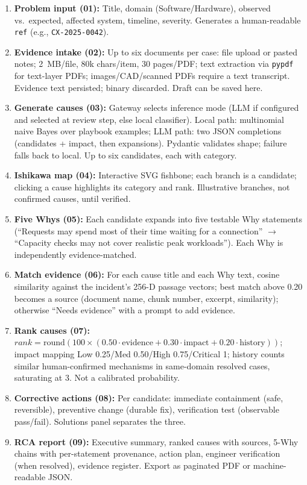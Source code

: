 \documentclass[12pt,a4paper,oneside]{report}
\begin{document}
\begin{enumerate}[label=\textbf{\arabic*.},leftmargin=1.6em]
\item \textbf{Problem input (01):} Title, domain (Software/Hardware), observed vs.\ expected, affected system, timeline, severity. Generates a human-readable \texttt{ref} (e.g., \texttt{CX-2025-0042}).
\item \textbf{Evidence intake (02):} Up to six documents per case: file upload or pasted notes; 2~MB/file, 80k chars/item, 30 pages/PDF; text extraction via \texttt{pypdf} for text-layer PDFs; images/CAD/scanned PDFs require a text transcript. Evidence text persisted; binary discarded. Draft can be saved here.
\item \textbf{Generate causes (03):} Gateway selects inference mode (LLM if configured and selected at review step, else local classifier). Local path: multinomial naive Bayes over playbook examples; LLM path: two JSON completions (candidates + impact, then expansions). Pydantic validates shape; failure falls back to local. Up to six candidates, each with category.
\item \textbf{Ishikawa map (04):} Interactive SVG fishbone; each branch is a candidate; clicking a cause highlights its category and rank. Illustrative branches, not confirmed causes, until verified.
\item \textbf{Five Whys (05):} Each candidate expands into five testable Why statements (``Requests may spend most of their time waiting for a connection'' $\rightarrow$ ``Capacity checks may not cover realistic peak workloads''). Each Why is independently evidence-matched.
\item \textbf{Match evidence (06):} For each cause title and each Why text, cosine similarity against the incident's 256-D passage vectors; best match above 0.20 becomes a source (document name, chunk number, excerpt, similarity); otherwise ``Needs evidence'' with a prompt to add evidence.
\item \textbf{Rank causes (07):} $rank = \text{round}(100\times(0.50\cdot\text{evidence}+0.30\cdot\text{impact}+0.20\cdot\text{history}))$; impact mapping Low 0.25/Med 0.50/High 0.75/Critical 1; history counts similar human-confirmed mechanisms in same-domain resolved cases, saturating at 3. Not a calibrated probability.
\item \textbf{Corrective actions (08):} Per candidate: immediate containment (safe, reversible), preventive change (durable fix), verification test (observable pass/fail). Solutions panel separates the three.
\item \textbf{RCA report (09):} Executive summary, ranked causes with sources, 5-Why chains with per-statement provenance, action plan, engineer verification (when resolved), evidence register. Export as paginated PDF or machine-readable JSON.
\end{enumerate}
\end{document}
